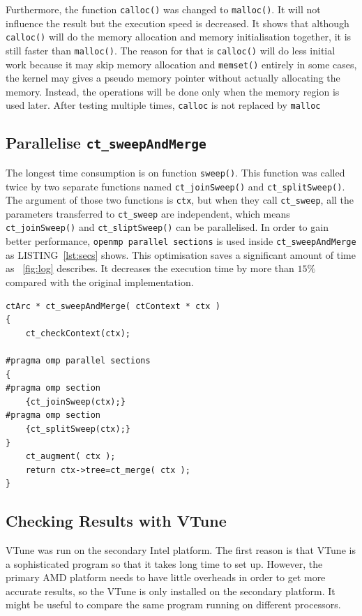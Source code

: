 \documentclass[conference]{IEEEtran}
\newcommand{\fref}[1]{\figurename~\ref{#1}}
\newcommand{\lref}[1]{LISTING~\ref{#1}}
\begin{document}
Furthermore, the function \texttt{calloc()} was changed to \texttt{malloc()}. It will not influence the result but the execution speed is decreased. It shows that although \texttt{calloc()} will do the memory allocation and memory initialisation together, it is still faster than \texttt{malloc()}. The reason for that is \texttt{calloc()} will do less initial work because it may skip memory allocation and \texttt{memset()} entirely in some cases, the kernel may gives a pseudo memory pointer without actually allocating the memory. Instead, the operations will be done only when the memory region is used later. After testing multiple times, \texttt{calloc} is not replaced by \texttt{malloc}

\subsection{Parallelise \texttt{ct\_sweepAndMerge}} \label{sec:sam}
The longest time consumption is on function \texttt{sweep()}. This function was called twice by two separate functions named \texttt{ct\_joinSweep()} and \texttt{ct\_splitSweep()}. The argument of those two functions is \texttt{ctx}, but when they call \texttt{ct\_sweep}, all the parameters transferred to \texttt{ct\_sweep} are independent, which means \texttt{ct\_joinSweep()} and \texttt{ct\_sliptSweep()} can be parallelised. In order to gain better performance, \texttt{openmp parallel sections} is used inside \texttt{ct\_sweepAndMerge} as \lref{lst:secs} shows. This optimisation saves a significant amount of time as \fref{fig:log} describes. It decreases the execution time by more than $15 \%$ compared with the original implementation. 

\begin{lstlisting}[float,floatplacement=t,caption={Data Load with SIMD Intrinsics},captionpos=b,label=lst:secs]
ctArc * ct_sweepAndMerge( ctContext * ctx )
{
    ct_checkContext(ctx);
    
#pragma omp parallel sections    
{    
#pragma omp section
    {ct_joinSweep(ctx);}
#pragma omp section
    {ct_splitSweep(ctx);}
}   
    ct_augment( ctx );
    return ctx->tree=ct_merge( ctx );
}
\end{lstlisting}

\subsection{Checking Results with VTune} \label{sec:vtune}

VTune was run on the secondary Intel platform. The first reason is that VTune is a sophisticated program so that it takes long time to set up. However, the primary AMD platform needs to have little overheads in order to get more accurate results, so the VTune is only installed on the secondary platform. It might be useful to compare the same program running on different processors.
\end{document}

